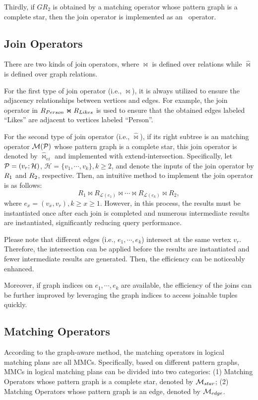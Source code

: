 Thirdly, if $GR_2$ is obtained by a matching operator whose pattern graph is a complete star, then the join operator is implemented as an \expandintersect~operator.




\subsection{Join Operators}
\label{sec:join-operator}
There are two kinds of join operators, where $\Join$ is defined over relations while $\widehat{\Join}$ is defined over graph relations.

For the first type of join operator (i.e., $\Join$), it is always utilized to ensure the adjacency relationships between vertices and edges.
For example, the join operator in ${R_{Person}} \Join {\ensuremath R_{Likes}}$ is used to ensure that the obtained edges labeled ``Likes'' are adjacent to vertices labeled ``Person''.




For the second type of join operator (i.e., $\widehat{\Join}$), if its right subtree is an matching operator $\mathcal{M}(\mathcal{P})$ whose pattern graph is a complete star, this join operator is denoted by $\widehat{\Join}_{ei}$ and implemented with extend-intersection.
Specifically, let \(\mathcal{P} = (v_r; \mathcal{H})\), $\mathcal{H} = \{v_1, \cdots, v_k\}, k \geq 2$, and denote the inputs of the join operator by ${R_{1}}$ and ${R_{2}}$, respective.
Then, an intuitive method to implement the join operator is as follows:
\begin{equation*}
    R_{1} \Join R_{\mathcal{L}(e_1)} \Join \cdots \Join R_{\mathcal{L}(e_k)} \Join R_{2},
\end{equation*}
where $e_x = (v_x, v_r), k \geq x \geq 1$.
However, in this process, the results must be instantiated once after each join is completed and numerous intermediate results are instantiated, significantly reducing query performance.

Please note that different edges (i.e., $e_1, \cdots, e_k$) intersect at the same vertex $v_r$.
Therefore, the intersection can be applied before the results are instantiated and fewer intermediate results are generated.
Then, the efficiency can be noticeably enhanced.

Moreover, if graph indices on $e_1, \cdots, e_k$ are available, the efficiency of the joins can be further improved by leveraging the graph indices to access joinable tuples quickly.


\subsection{Matching Operators}
\label{sec:matching-operator}
According to the graph-aware method, the matching operators in logical matching plans are all MMCs.
Specifically, based on different pattern graphs, MMCs in logical matching plans can be divided into two categories: 
(1) Matching Operators whose pattern graph is a complete star, denoted by $\mathcal{M}_{star}$;
(2) Matching Operators whose pattern graph is an edge, denoted by $\mathcal{M}_{edge}$.

